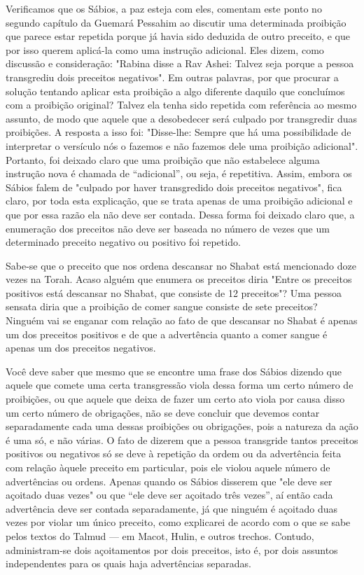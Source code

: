 Verificamos que os Sábios, a paz esteja com eles, comentam este pon­to
no segundo capítulo da Guemará Pessahim ao discutir uma determinada
proi­bição que parece estar repetida porque já havia sido deduzida de
outro precei­to, e que por isso querem aplicá-la como uma instrução
adicional. Eles dizem, como discussão e consideração: "Rabina disse a
Rav Ashei: Talvez seja porque a pessoa transgrediu dois preceitos
negativos". Em outras palavras, por que pro­curar a solução tentando
aplicar esta proibição a algo diferente daquilo que con­cluímos com a
proibição original? Talvez ela tenha sido repetida com referên­cia ao
mesmo assunto, de modo que aquele que a desobedecer será culpado por
transgredir duas proibições. A resposta a isso foi: "Disse-lhe: Sempre
que há uma possibilidade de interpretar o versículo nós o fazemos e não
fazemos dele uma proibição adicional". Portanto, foi deixado claro que
uma proibição que não estabelece alguma instrução nova é chamada de
``adicional'', ou seja, é repetitiva. Assim, embora os Sábios falem de
"culpado por haver transgredi­do dois preceitos negativos", fica claro,
por toda esta explicação, que se trata apenas de uma proibição adicional
e que por essa razão ela não deve ser conta­da. Dessa forma foi deixado
claro que, a enumeração dos preceitos não deve ser baseada no número de
vezes que um determinado preceito negativo ou po­sitivo foi repetido.

Sabe-se que o preceito que nos ordena descansar no Shabat está
men­cionado doze vezes na Torah. Acaso alguém que enumera os preceitos
diria "Entre os preceitos positivos está descansar no Shabat, que
consiste de 12 preceitos"? 
Uma pessoa sensata diria que a proibição de comer sangue
consiste de sete preceitos? Ninguém vai se enganar com relação ao fato
de que descan­sar no Shabat é apenas um dos preceitos positivos e de que
a advertência quan­to a comer sangue é apenas um dos preceitos
negativos.

Você deve saber que mesmo que se encontre uma frase dos Sábios dizendo
que aquele que comete uma certa transgressão viola dessa forma um certo
número de proibições, ou que aquele que deixa de fazer um certo ato
viola por causa disso um certo número de obrigações, não se deve
concluir que devemos contar separadamente cada uma dessas proibições ou
obrigações, pois a natureza da ação é uma só, e não várias. O fato de
dizerem que a pessoa transgride tantos preceitos positivos ou negativos
só se deve à repetição da or­dem ou da advertência feita com relação
àquele preceito em particular, pois ele violou aquele número de
advertências ou ordens. Apenas quando os Sábios disserem que "ele deve
ser açoitado duas vezes" ou que ``ele deve ser açoitado três vezes'', aí
então cada advertência deve ser contada separadamente, já que ninguém é
açoitado duas vezes por violar um único preceito, como explicarei de
acordo com o que se sabe pelos textos do Talmud --- em Macot, Hulin, e
outros trechos. Contudo, administram-se dois açoitamentos por dois
preceitos, isto é, por dois assuntos independentes para os quais haja
advertências separadas.

